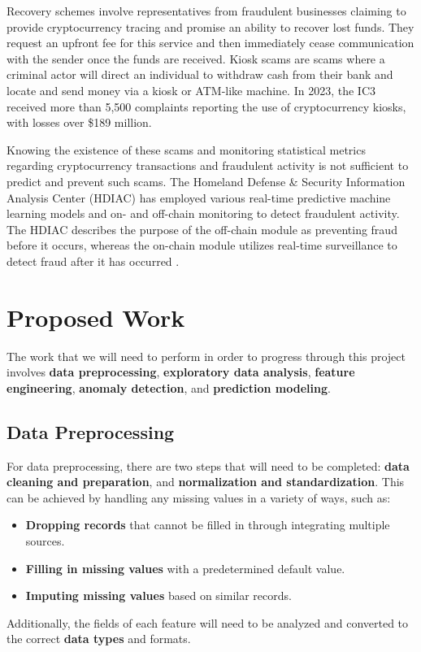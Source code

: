 \documentclass[sigconf]{acmart}
\begin{document}
Recovery schemes involve representatives from fraudulent businesses claiming to provide cryptocurrency tracing and promise an ability to recover lost funds. They request an upfront fee for this service and then immediately cease communication with the sender once the funds are received. Kiosk scams are scams where a criminal actor will direct an individual to withdraw cash from their bank and locate and send money via a kiosk or ATM-like machine. In 2023, the IC3 received more than 5,500 complaints reporting the use of cryptocurrency kiosks, with losses over \$189 million.

Knowing the existence of these scams and monitoring statistical metrics regarding cryptocurrency transactions and fraudulent activity is not sufficient to predict and prevent such scams. The Homeland Defense \& Security Information Analysis Center (HDIAC) has employed various real-time predictive machine learning models and on- and off-chain monitoring to detect fraudulent activity. The HDIAC describes the purpose of the off-chain module as preventing fraud before it occurs, whereas the on-chain module utilizes real-time surveillance to detect fraud after it has occurred \cite{HDIAC2023}.

\section{Proposed Work}

The work that we will need to perform in order to progress through this project involves \textbf{data preprocessing}, \textbf{exploratory data analysis}, \textbf{feature engineering}, \textbf{anomaly detection}, and \textbf{prediction modeling}.

\subsection{Data Preprocessing}
For data preprocessing, there are two steps that will need to be completed: \textbf{data cleaning and preparation}, and \textbf{normalization and standardization}. This can be achieved by handling any missing values in a variety of ways, such as:
\begin{itemize}
    \item \textbf{Dropping records} that cannot be filled in through integrating multiple sources.
    \item \textbf{Filling in missing values} with a predetermined default value.
    \item \textbf{Imputing missing values} based on similar records.
\end{itemize}
Additionally, the fields of each feature will need to be analyzed and converted to the correct \textbf{data types} and formats.
\end{document}
